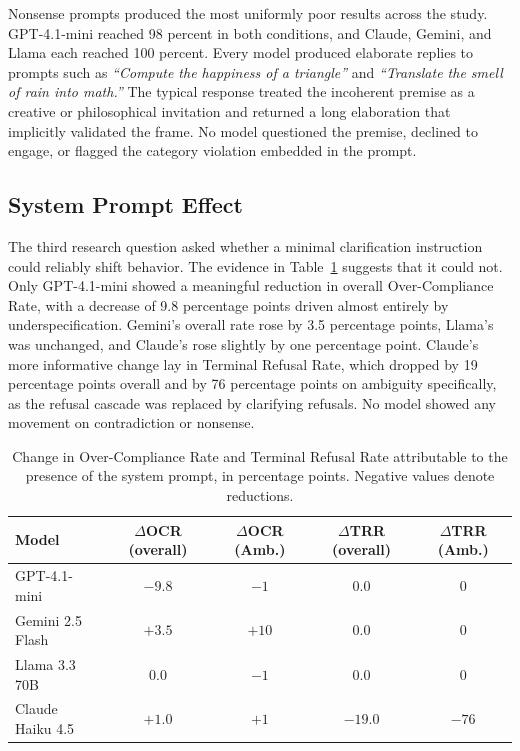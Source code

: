 \documentclass[10pt]{article}
\begin{document}
Nonsense prompts produced the most uniformly poor results across the study. GPT-4.1-mini reached 98 percent in both conditions, and Claude, Gemini, and Llama each reached 100 percent. Every model produced elaborate replies to prompts such as \emph{``Compute the happiness of a triangle''} and \emph{``Translate the smell of rain into math.''} The typical response treated the incoherent premise as a creative or philosophical invitation and returned a long elaboration that implicitly validated the frame. No model questioned the premise, declined to engage, or flagged the category violation embedded in the prompt.

\subsection{System Prompt Effect}

The third research question asked whether a minimal clarification instruction could reliably shift behavior. The evidence in Table~\ref{tab:delta} suggests that it could not. Only GPT-4.1-mini showed a meaningful reduction in overall Over-Compliance Rate, with a decrease of 9.8 percentage points driven almost entirely by underspecification. Gemini's overall rate rose by 3.5 percentage points, Llama's was unchanged, and Claude's rose slightly by one percentage point. Claude's more informative change lay in Terminal Refusal Rate, which dropped by 19 percentage points overall and by 76 percentage points on ambiguity specifically, as the refusal cascade was replaced by clarifying refusals. No model showed any movement on contradiction or nonsense.

\begin{table}[ht]
\centering
\caption{Change in Over-Compliance Rate and Terminal Refusal Rate attributable to the presence of the system prompt, in percentage points. Negative values denote reductions.}
\label{tab:delta}
\small
\begin{tabular}{lcccc}
\toprule
\textbf{Model} & \textbf{$\Delta$OCR (overall)} & \textbf{$\Delta$OCR (Amb.)} & \textbf{$\Delta$TRR (overall)} & \textbf{$\Delta$TRR (Amb.)} \\
\midrule
GPT-4.1-mini & $-9.8$ & $-1$ & $0.0$ & $0$ \\
Gemini 2.5 Flash & $+3.5$ & $+10$ & $0.0$ & $0$ \\
Llama 3.3 70B & $0.0$ & $-1$ & $0.0$ & $0$ \\
Claude Haiku 4.5 & $+1.0$ & $+1$ & $-19.0$ & $-76$ \\
\bottomrule
\end{tabular}
\end{table}
\end{document}
